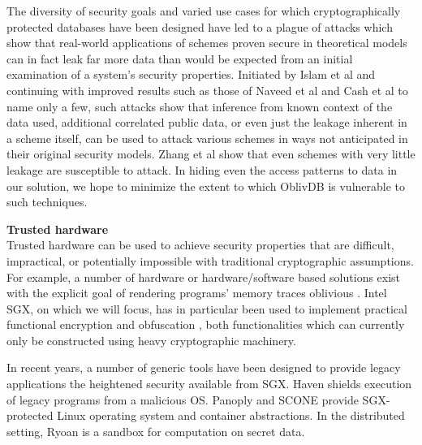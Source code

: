 \documentclass[conference]{IEEEtran}
\def\name/{OblivDB}
\begin{document}
The diversity of security goals and varied use cases for which cryptographically protected databases have been designed have led to a plague of attacks which show that real-world applications of schemes proven secure in theoretical models can in fact leak far more data than would be expected from an initial examination of a system's security properties. Initiated by Islam et al \cite{IKK12} and continuing with improved results such as those of Naveed et al \cite{NKW15} and Cash et al \cite{CGPR15} to name only a few, such attacks show that inference from known context of the data used, additional correlated public data, or even just the leakage inherent in a scheme itself, can be used to attack various schemes in ways not anticipated in their original security models. Zhang et al \cite{ZKP16} show that even schemes with very little leakage are susceptible to attack. In hiding even the access patterns to data in our solution, we hope to minimize the extent to which \name/ is vulnerable to such techniques.   

\medskip \noindent \textbf{Trusted hardware}\\
Trusted hardware can be used to achieve security properties that are difficult, impractical, or potentially impossible with traditional cryptographic assumptions. For example, a number of hardware or hardware/software based solutions exist with the explicit goal of rendering programs' memory traces oblivious \cite{CLD16, LHM+15, MLS+13}. Intel SGX, on which we will focus, has in particular been used to implement practical functional encryption \cite{FVBG16} and obfuscation \cite{NFR+17}, both functionalities which can currently only be constructed using heavy cryptographic machinery.

In recent years, a number of generic tools have been designed to provide legacy applications the heightened security available from SGX. Haven \cite{BPH15} shields execution of legacy programs from a malicious OS. Panoply and SCONE \cite{STTS17, ATG+16} provide SGX-protected Linux operating system and container abstractions. In the distributed setting, Ryoan \cite{HZX+16} is a sandbox for computation on secret data. 
\end{document}

